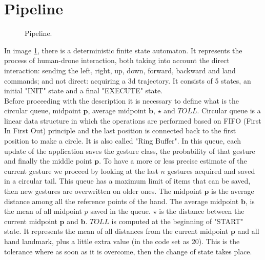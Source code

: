 
\section{Pipeline}
\label{sec:pipeline}
\begin{figure}[H]
	\caption[Pipeline.]{Pipeline.}\label{fig:Pipeline}
\end{figure}

In image \ref{fig:Pipeline}, there is a deterministic finite state automaton. It represents the process of human-drone interaction, both taking into account the direct interaction: sending the left, right, up, down, forward, backward and land commands; and not direct: acquiring a 3d trajectory. It consists of 5 states, an initial "INIT" state and a final "EXECUTE" state. \\

\noindent Before proceeding with the description it is necessary to define what is the circular queue, midpoint $\bm{p}$, average midpoint $\bm{b}$, $\star$ and $TOLL$. Circular queue is a linear data structure in which the operations are performed based on FIFO (First In First Out) principle and the last position is connected back to the first position to make a circle. It is also called "Ring Buffer". In this queue, each update of the application saves the gesture class, the probability of that gesture and finally the middle point $\bm{p}$. To have a more or less precise estimate of the current gesture we proceed by looking at the last $n$ gestures acquired and saved in a circular tail. This queue has a maximum limit of items that can be saved, then new gestures are overwritten on older ones. The midpoint $\bm{p}$ is the average distance among all the reference points of the hand. The average midpoint $\bm{b}$, is the mean of all midpoint $p$ saved in the queue. $\star$ is the distance between the current midpoint $\bm{p}$ and $\bm{b}$. $TOLL$ is computed at the beginning of "START" state. It represents the mean of all distances from the current midpoint $\bm{p}$ and all hand landmark, plus a little extra value (in the code set as 20). This is the tolerance where as soon as it is overcome, then the change of state takes place. \\

